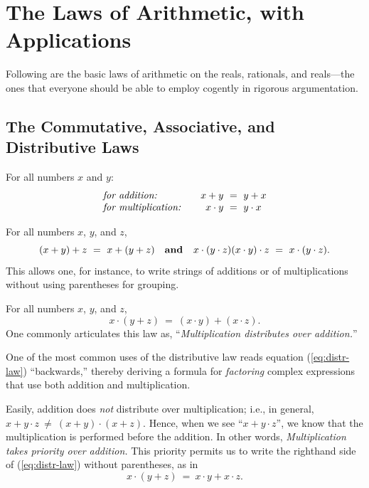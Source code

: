 \section{The Laws of Arithmetic, with Applications}
\label{sec:Arithmetic-Laws}

Following are the basic laws of arithmetic on the reals, rationals,
and reals---the ones that everyone should be able to employ cogently
in rigorous argumentation.

\subsection{The Commutative, Associative, and Distributive Laws} 

For all numbers $x$ and $y$:
\[
\begin{array}{llc}
\mbox{\it for addition:}
  & & x+y \ = \ y+x \\
\mbox{\it for multiplication:}
  & & x \cdot y \ = \ y \cdot x
\end{array}
\]

For all numbers $x$, $y$, and $z$,
\[ (x+y)+z \ = \ x+(y+z) \ \ \ \mbox{\bf and } \ \ 
x\cdot (y\cdot z) 
(x \cdot y) \cdot z \ = \ x\cdot (y\cdot z). \] 
This allows one, for instance, to write strings of additions or of
multiplications without using parentheses for grouping.


For all numbers $x$, $y$, and $z$,
\begin{equation}
\label{eq:distr-law}
x \cdot (y + z) \ = \ (x \cdot y) + (x \cdot z).
\end{equation}
One commonly articulates this law as, ``{\em Multiplication
  distributes over addition.}''


One of the most common uses of the distributive law reads equation
(\ref{eq:distr-law}) ``backwards,'' thereby deriving a formula for
{\em factoring} \index{arithmetic!factoring} complex expressions that
use both addition and multiplication.

Easily, addition does {\em not} distribute over multiplication; i.e.,
in general, $x + y \cdot z \ \neq \ (x+y) \cdot (x+z)$.  Hence, when
we see ``$x + y \cdot z$'', we know that the multiplication is
performed before the addition.  In other words, {\em Multiplication
  takes priority over addition.}   This priority permits us to write the
righthand side of (\ref{eq:distr-law}) without parentheses, as in
\[ x \cdot (y + z) \ = \ x \cdot y + x \cdot z. \]

